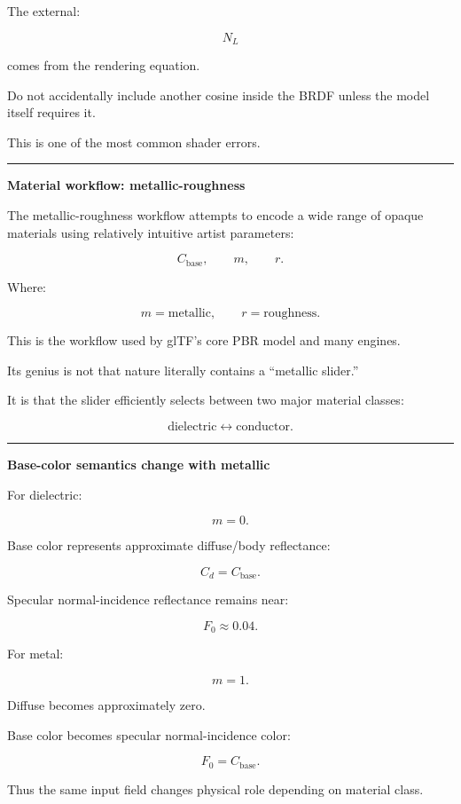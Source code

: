 The external:

\[
N_L
\]

comes from the rendering equation.

Do not accidentally include another cosine inside the BRDF unless the model itself requires it.

This is one of the most common shader errors.

\begin{center}\rule{0.5\linewidth}{0.5pt}\end{center}

\textbf{Material workflow: metallic-roughness}

The metallic-roughness workflow attempts to encode a wide range of opaque materials using relatively intuitive artist parameters:

\[
C_{\text{base}},
\qquad
m,
\qquad
r.
\]

Where:

\[
m=\text{metallic},
\qquad
r=\text{roughness}.
\]

This is the workflow used by glTF's core PBR model and many engines.

Its genius is not that nature literally contains a ``metallic slider.''

It is that the slider efficiently selects between two major material classes:

\[
\text{dielectric}
\leftrightarrow
\text{conductor}.
\]

\begin{center}\rule{0.5\linewidth}{0.5pt}\end{center}

\textbf{Base-color semantics change with metallic}

For dielectric:

\[
m=0.
\]

Base color represents approximate diffuse/body reflectance:

\[
C_d=C_{\text{base}}.
\]

Specular normal-incidence reflectance remains near:

\[
F_0\approx0.04.
\]

For metal:

\[
m=1.
\]

Diffuse becomes approximately zero.

Base color becomes specular normal-incidence color:

\[
F_0=C_{\text{base}}.
\]

Thus the same input field changes physical role depending on material class.

